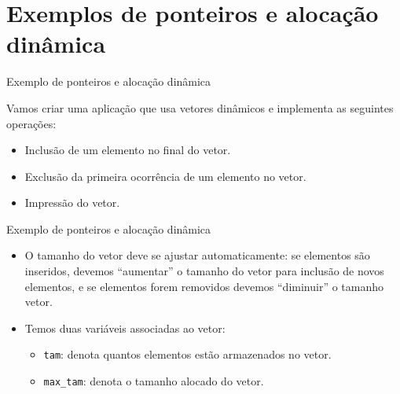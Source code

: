 \documentclass[handout]{beamer}
\newcommand{\cod}[1]{\texttt{#1}}
\begin{document}
\section{Exemplos de ponteiros e alocação dinâmica}

\begin{frame}[fragile]{Exemplo de ponteiros e alocação dinâmica}
    
    Vamos criar uma aplicação que usa vetores dinâmicos e implementa as seguintes operações:

    \begin{itemize}
        \item Inclusão de um elemento no final do vetor.
        \item Exclusão da primeira ocorrência de um elemento no vetor.
        \item Impressão do vetor.
    \end{itemize}

\end{frame}

\begin{frame}[fragile]{Exemplo de ponteiros e alocação dinâmica}

    \begin{itemize}[<+->]
        \item O tamanho do vetor deve se ajustar automaticamente: se elementos são inseridos, devemos ``aumentar'' o tamanho do vetor para inclusão de novos elementos, e se elementos forem removidos devemos ``diminuir'' o tamanho vetor.

        \item Temos duas variáveis associadas ao vetor:
        \begin{itemize}
            \item \cod{tam}: denota quantos elementos estão armazenados no vetor. 
            \item \texttt{max_tam}: denota o tamanho alocado do vetor.
        \end{itemize}
  \end{itemize}

\end{frame}
\end{document}
